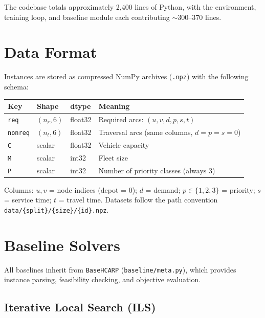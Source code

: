 \documentclass[11pt,a4paper]{article}
\begin{document}
The codebase totals approximately 2,400 lines of Python, with the environment,
training loop, and baseline module each contributing $\sim$300--370 lines.

\section{Data Format}

Instances are stored as compressed NumPy archives (\texttt{.npz}) with the
following schema:

\begin{center}
\begin{tabular}{lllp{6cm}}
\toprule
\textbf{Key} & \textbf{Shape} & \textbf{dtype} & \textbf{Meaning} \\
\midrule
\texttt{req}    & $(n_r, 6)$ & float32 & Required arcs: $(u,v,d,p,s,t)$ \\
\texttt{nonreq} & $(n_t, 6)$ & float32 & Traversal arcs (same columns, $d=p=s=0$) \\
\texttt{C}      & scalar     & float32 & Vehicle capacity \\
\texttt{M}      & scalar     & int32   & Fleet size \\
\texttt{P}      & scalar     & int32   & Number of priority classes (always 3) \\
\bottomrule
\end{tabular}
\end{center}

Columns: $u,v$ = node indices (depot = 0); $d$ = demand; $p \in \{1,2,3\}$ =
priority; $s$ = service time; $t$ = travel time. Datasets follow the path
convention \texttt{data/\{split\}/\{size\}/\{id\}.npz}.

\section{Baseline Solvers}

All baselines inherit from \texttt{BaseHCARP} (\texttt{baseline/meta.py}), which
provides instance parsing, feasibility checking, and objective evaluation.

\subsection{Iterative Local Search (ILS)}
\end{document}
